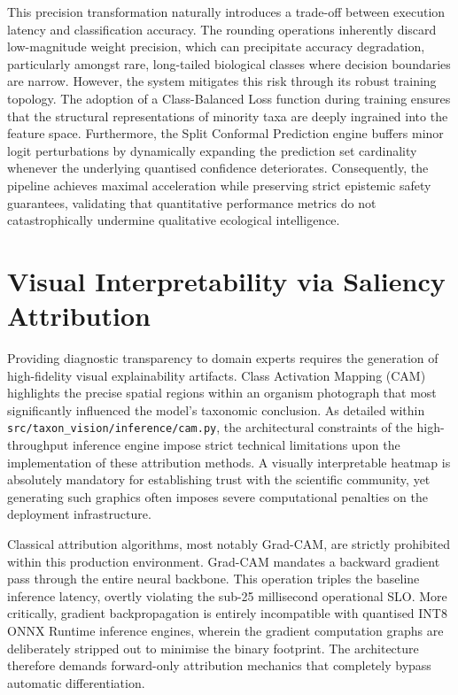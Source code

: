 This precision transformation naturally introduces a trade-off between execution latency and classification accuracy. The rounding operations inherently discard low-magnitude weight precision, which can precipitate accuracy degradation, particularly amongst rare, long-tailed biological classes where decision boundaries are narrow. However, the system mitigates this risk through its robust training topology. The adoption of a Class-Balanced Loss function during training ensures that the structural representations of minority taxa are deeply ingrained into the feature space. Furthermore, the Split Conformal Prediction engine buffers minor logit perturbations by dynamically expanding the prediction set cardinality whenever the underlying quantised confidence deteriorates. Consequently, the pipeline achieves maximal acceleration while preserving strict epistemic safety guarantees, validating that quantitative performance metrics do not catastrophically undermine qualitative ecological intelligence.

\section{Visual Interpretability via Saliency Attribution}
\label{sec:visual_interpretability}

Providing diagnostic transparency to domain experts requires the generation of high-fidelity visual explainability artifacts. Class Activation Mapping (CAM) highlights the precise spatial regions within an organism photograph that most significantly influenced the model's taxonomic conclusion. As detailed within \texttt{src/taxon\_vision/inference/cam.py}, the architectural constraints of the high-throughput inference engine impose strict technical limitations upon the implementation of these attribution methods. A visually interpretable heatmap is absolutely mandatory for establishing trust with the scientific community, yet generating such graphics often imposes severe computational penalties on the deployment infrastructure.

Classical attribution algorithms, most notably Grad-CAM, are strictly prohibited within this production environment. Grad-CAM mandates a backward gradient pass through the entire neural backbone. This operation triples the baseline inference latency, overtly violating the sub-25 millisecond operational SLO. More critically, gradient backpropagation is entirely incompatible with quantised INT8 ONNX Runtime inference engines, wherein the gradient computation graphs are deliberately stripped out to minimise the binary footprint. The architecture therefore demands forward-only attribution mechanics that completely bypass automatic differentiation.

